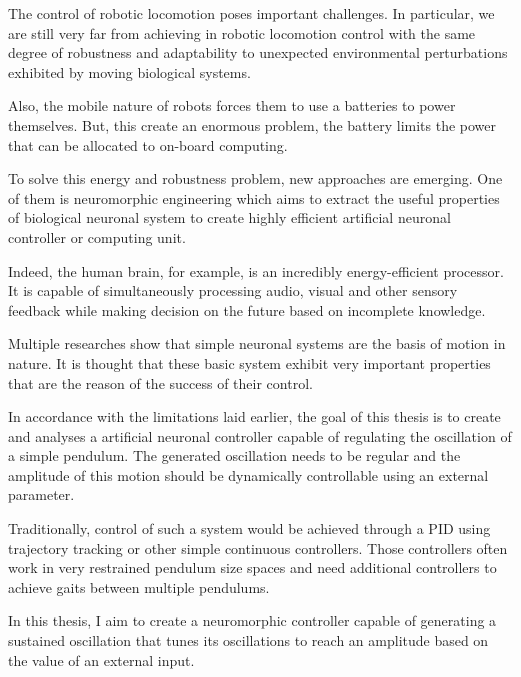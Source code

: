 The control of robotic locomotion poses important challenges. 
In particular, we are still very far from achieving in robotic locomotion control with the same degree of robustness and adaptability to unexpected environmental perturbations exhibited by moving biological systems.

Also, the mobile nature of robots forces them to use a batteries to power themselves. But, this create an enormous problem, the battery limits the power that can be allocated to on-board computing. 

To solve this energy and robustness problem, new approaches are emerging. One of them is neuromorphic engineering which aims to extract the useful properties of biological neuronal system to create highly efficient artificial neuronal controller or computing unit.

Indeed, the human brain, for example, is an incredibly energy-efficient processor. 
It is capable of simultaneously processing audio, visual and other sensory feedback while making decision on the future based on incomplete knowledge. 

Multiple researches \citep{crayfish,stickInsect,MARDER} show that simple neuronal systems are the basis of motion in nature.
It is thought that these basic system exhibit very important properties that are the reason of the success of their control.

In accordance with the limitations laid earlier, the goal of this thesis is to create and analyses a artificial neuronal controller capable of regulating the oscillation of a simple pendulum. The generated oscillation needs to be regular and the amplitude of this motion should be dynamically controllable using an external parameter.

Traditionally, control of such a system would be achieved through a PID using trajectory tracking or other simple continuous controllers. Those controllers often work in very restrained pendulum size spaces and need additional controllers to achieve gaits between multiple pendulums.

In this thesis, I aim to create a neuromorphic controller capable of generating a sustained oscillation that tunes its oscillations to reach an amplitude based on the value of an external input.

